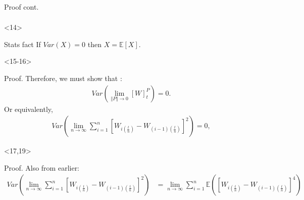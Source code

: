 \documentclass[10pt]{beamer}
\begin{document}
\begin{frame}[t]
\begin{onlyenv}
\begin{block}{Proof cont.}
{\begin{align*}
      \end{align*}
      }
      \end{block}
    \end{onlyenv}
    \begin{onlyenv}<14>
      \begin{block}{Stats fact}
        If $Var(X) = 0$ then $X = \mathbb{E}\left[ X \right]$.
      \end{block}
    \end{onlyenv}
    \begin{onlyenv}<15-16>
      \begin{block}{Proof.}
        Therefore, we must show that :
        \begin{align*}
          Var(\lim\limits_{\Vert P \Vert \to 0} \left[ W \right]^{P}_t) = 0.
        \end{align*}
        Or equivalently,
        \begin{align*}
          Var(\lim\limits_{n \to \infty} \displaystyle\sum_{i=1}^{n}\left[W_{i(\frac{t}{n})} - W_{(i-1)(\frac{t}{n})}\right]^2) = 0,
        \end{align*}
      \end{block}
    \end{onlyenv}
    \begin{onlyenv}<17,19>
      \begin{block}{Proof.}
        Also from earlier:
        \begin{align*}
          Var(\lim\limits_{n \to \infty} \displaystyle\sum_{i=1}^{n}\left[W_{i(\frac{t}{n})} - W_{(i-1)(\frac{t}{n})}\right]^2) &= \lim\limits_{n \to \infty} \displaystyle\sum_{i=1}^{n} \mathbb{E}(\left[W_{i(\frac{t}{n})} - W_{(i-1)(\frac{t}{n})}\right]^4) \\

\end{align*}
\end{block}
\end{onlyenv}
\end{frame}
\end{document}
